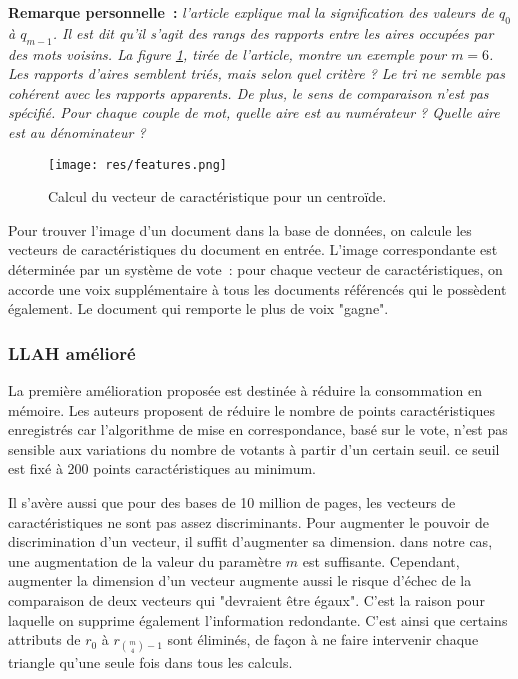 \documentclass[a4paper]{article}
\begin{document}
\textbf{Remarque personnelle~:} \textit{l'article explique mal la signification des valeurs de $q_0$ à $q_{m-1}$. Il est dit qu'il s'agit des rangs des rapports entre les aires occupées par des mots voisins. La figure \ref{fig:features}, tirée de l'article, montre un exemple pour $m = 6$. Les rapports d'aires semblent triés, mais selon quel critère ? Le tri ne semble pas cohérent avec les rapports apparents. De plus, le sens de comparaison n'est pas spécifié. Pour chaque couple de mot, quelle aire est au numérateur ? Quelle aire est au dénominateur ?}

\begin{figure}[!h]
\centering
\texttt{[image: res/features.png]}
\caption{\label{fig:features}Calcul du vecteur de caractéristique pour un centroïde.}
\end{figure}

Pour trouver l'image d'un document dans la base de données, on calcule les vecteurs de caractéristiques du document en entrée. L'image correspondante est déterminée par un système de vote~: pour chaque vecteur de caractéristiques, on accorde une voix supplémentaire à tous les documents référencés qui le possèdent également. Le document qui remporte le plus de voix "gagne".

\subsubsection{LLAH amélioré}
La première amélioration proposée est destinée à réduire la consommation en mémoire. Les auteurs proposent de réduire le nombre de points caractéristiques enregistrés car l'algorithme de mise en correspondance, basé sur le vote, n'est pas sensible aux variations du nombre de votants à partir d'un certain seuil. ce seuil est fixé à 200 points caractéristiques au minimum.

Il s'avère aussi que pour des bases de 10 million de pages, les vecteurs de caractéristiques ne sont pas assez discriminants. Pour augmenter le pouvoir de discrimination d'un vecteur, il suffit d'augmenter sa dimension. dans notre cas, une augmentation de la valeur du paramètre $m$ est suffisante. Cependant, augmenter la dimension d'un vecteur augmente aussi le risque d'échec de la comparaison de deux vecteurs qui "devraient être égaux". C'est la raison pour laquelle on supprime également l'information redondante. C'est ainsi que certains attributs de $r_0$ à $r_{{m\choose 4}-1}$ sont éliminés, de façon à ne faire intervenir chaque triangle qu'une seule fois dans tous les calculs.\\
\\
\end{document}
